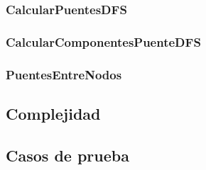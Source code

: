 \subsubsection*{CalcularPuentesDFS}

\subsubsection*{CalcularComponentesPuenteDFS}

\subsubsection*{PuentesEntreNodos}

\subsection{Complejidad}

\subsection{Casos de prueba}
